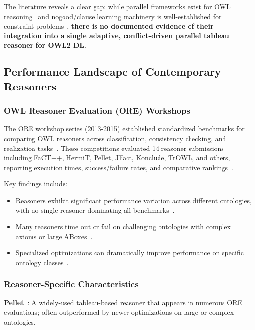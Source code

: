 The literature reveals a clear gap: while parallel frameworks exist for OWL reasoning~\cite{quan2017parallel,quan2019framework,liu2017spowl,gu2015cichlid} and nogood/clause learning machinery is well-established for constraint problems~\cite{glorian2020nacre}, \textbf{there is no documented evidence of their integration into a single adaptive, conflict-driven parallel tableau reasoner for OWL2 DL}.

\subsection{Performance Landscape of Contemporary Reasoners}

\subsubsection{OWL Reasoner Evaluation (ORE) Workshops}

The ORE workshop series (2013-2015) established standardized benchmarks for comparing OWL reasoners across classification, consistency checking, and realization tasks~\cite{parsia2015ore,scioscia2021ore}. These competitions evaluated 14 reasoner submissions including FaCT++, HermiT, Pellet, JFact, Konclude, TrOWL, and others, reporting execution times, success/failure rates, and comparative rankings~\cite{parsia2015ore,scioscia2021ore}.

Key findings include:
\begin{itemize}
    \item Reasoners exhibit significant performance variation across different ontologies, with no single reasoner dominating all benchmarks~\cite{kang2012rigorous}.
    \item Many reasoners time out or fail on challenging ontologies with complex axioms or large ABoxes~\cite{parsia2015ore,scioscia2021ore}.
    \item Specialized optimizations can dramatically improve performance on specific ontology classes~\cite{song2013complete,glimm2014coupling}.
\end{itemize}

\subsubsection{Reasoner-Specific Characteristics}

\textbf{Pellet}~\cite{sirin2007pellet}: A widely-used tableau-based reasoner that appears in numerous ORE evaluations; often outperformed by newer optimizations on large or complex ontologies.


